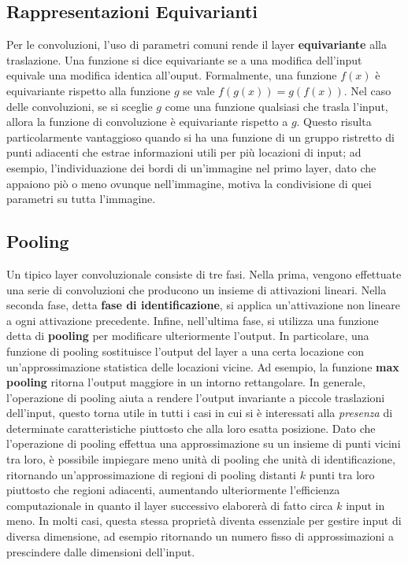 \documentclass[12pt,a4paper]{report}
\begin{document}
    \subsection{Rappresentazioni Equivarianti}
    Per le convoluzioni, l'uso di parametri comuni rende il layer
    \textbf{equivariante} alla traslazione. Una funzione si dice
    equivariante se a una modifica dell'input equivale una modifica
    identica all'ouput. Formalmente, una funzione $f(x)$ \`e
    equivariante rispetto alla funzione $g$ se vale 
    $f(g(x))=g(f(x))$. Nel caso delle convoluzioni, se si sceglie
    $g$ come una funzione qualsiasi che trasla l'input, allora
    la funzione di convoluzione \`e equivariante rispetto a $g$.
    Questo risulta particolarmente vantaggioso quando si ha una 
    funzione di un gruppo ristretto di punti adiacenti che estrae
    informazioni utili per pi\`u locazioni di input; ad esempio,
    l'individuazione dei bordi di un'immagine nel primo layer, dato
    che appaiono pi\`o o meno ovunque nell'immagine, motiva la 
    condivisione di quei parametri su tutta l'immagine.

    \subsection{Pooling}
    Un tipico layer convoluzionale consiste di tre fasi. Nella
    prima, vengono effettuate una serie di convoluzioni che 
    producono un insieme di attivazioni lineari. Nella seconda
    fase, detta \textbf{fase di identificazione}, si applica
    un'attivazione non lineare a ogni attivazione precedente.
    Infine, nell'ultima fase, si utilizza una funzione detta di
    \textbf{pooling} per modificare ulteriormente l'output.
    In particolare, una funzione di pooling sostituisce l'output
    del layer a una certa locazione con un'approssimazione 
    statistica delle locazioni vicine. Ad esempio, la funzione 
    \textbf{max pooling} ritorna l'output maggiore in un intorno
    rettangolare. In generale, l'operazione di pooling aiuta a 
    rendere l'output invariante a piccole traslazioni dell'input,
    questo torna utile in tutti i casi in cui si \`e interessati
    alla \textit{presenza} di determinate caratteristiche piuttosto
    che alla loro esatta posizione.
    Dato che l'operazione di pooling effettua una approssimazione
    su un insieme di punti vicini tra loro, \`e possibile impiegare
    meno unit\`a di pooling che unit\`a di identificazione, 
    ritornando un'approssimazione di regioni di pooling distanti
    $k$ punti tra loro piuttosto che regioni adiacenti, aumentando
    ulteriormente l'efficienza computazionale in quanto il
    layer successivo elaborer\`a di fatto circa $k$ input in meno.
    In molti casi, questa stessa propriet\`a diventa essenziale
    per gestire input di diversa dimensione, ad esempio
    ritornando un numero fisso di approssimazioni a prescindere 
    dalle dimensioni dell'input.
\end{document}
